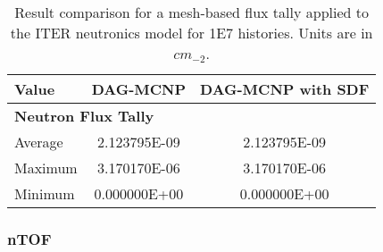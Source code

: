 \begin{table}
  \small
  \begin{center}
    \begin{tabular}{lcc}
          \toprule
          Value   & DAG-MCNP     & DAG-MCNP with SDF      \\
          \toprule
          \multicolumn{3}{l}{\textbf{Neutron Flux Tally}} \\
          Average & 2.123795E-09 & 2.123795E-09           \\
          Maximum & 3.170170E-06 & 3.170170E-06           \\
          Minimum & 0.000000E+00 & 0.000000E+00           \\
          \bottomrule
    \end{tabular}
  \end{center}
  \caption[Flux tally results in the ITER model for various DAG-MCNP
    implementations.]{Result comparison for a mesh-based flux tally applied to
    the ITER neutronics model for \num{1E7} histories. Units are in $cm_{-2}$.}
\end{table}


\subsubsection{nTOF}

